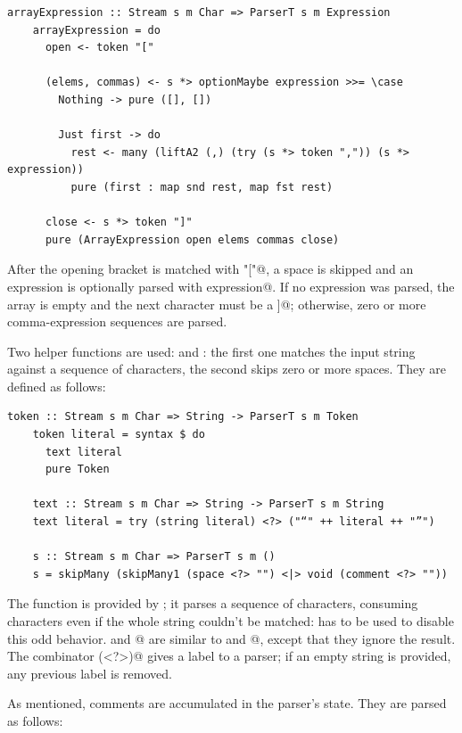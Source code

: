 \documentclass[UdineBachThesis,american,11pt]{PhdThesis}
\begin{document}
  \begin{lstlisting}[gobble=4,basicstyle=\ttfamily\small]
    arrayExpression :: Stream s m Char => ParserT s m Expression
    arrayExpression = do
      open <- token "["

      (elems, commas) <- s *> optionMaybe expression >>= \case
        Nothing -> pure ([], [])

        Just first -> do
          rest <- many (liftA2 (,) (try (s *> token ",")) (s *> expression))
          pure (first : map snd rest, map fst rest)

      close <- s *> token "]"
      pure (ArrayExpression open elems commas close)
  \end{lstlisting}

  After the opening bracket is matched with \lstinline@token "["@, a space is
  skipped and an expression is optionally parsed with
  \lstinline@optionMaybe expression@. If no expression was parsed, the array
  is empty and the next character must be a \lstinline@]@; otherwise, zero or
  more comma-expression sequences are parsed.

  Two helper functions are used: \lstinline@token@ and \lstinline@s@: the first
  one matches the input string against a sequence of characters, the second
  skips zero or more spaces. They are defined as follows:

  \begin{lstlisting}[gobble=4,basicstyle=\ttfamily\small]
    token :: Stream s m Char => String -> ParserT s m Token
    token literal = syntax $ do
      text literal
      pure Token

    text :: Stream s m Char => String -> ParserT s m String
    text literal = try (string literal) <?> ("“" ++ literal ++ "”")

    s :: Stream s m Char => ParserT s m ()
    s = skipMany (skipMany1 (space <?> "") <|> void (comment <?> ""))
  \end{lstlisting}

  The function \lstinline@string@ is provided by \lstinline@parsec@; it parses a
  sequence of characters, consuming characters even if the whole string couldn't
  be matched: \lstinline@try@ has to be used to disable this odd behavior.
  \lstinline@skipMany@ and @ are similar to \lstinline@many@
  and @, except that they ignore the result. The combinator
  \lstinline@(<?>)@ gives a label to a parser; if an empty string is provided,
  any previous label is removed.

  As mentioned, comments are accumulated in the parser's state. They are parsed
  as follows:
\end{document}
